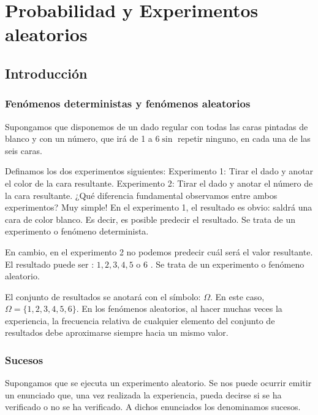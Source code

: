\documentclass[
]{article}
\begin{document}
\section{Probabilidad y Experimentos aleatorios}\label{probabilidad-y-experimentos-aleatorios}

\subsection{Introducción}\label{introducciuxf3n}

\subsubsection{Fenómenos deterministas y fenómenos aleatorios}\label{fenuxf3menos-deterministas-y-fenuxf3menos-aleatorios}

Supongamos que disponemos de un dado regular con todas las caras
pintadas de blanco y con un número, que irá de 1 a \(6 \sin\) repetir
ninguno, en cada una de las seis caras.

Definamos los dos experimentos siguientes: Experimento 1: Tirar el dado
y anotar el color de la cara resultante. Experimento 2: Tirar el dado y
anotar el número de la cara resultante. ¿Qué diferencia fundamental
observamos entre ambos experimentos? Muy simple! En el experimento 1, el
resultado es obvio: saldrá una cara de color blanco. Es decir, es
posible predecir el resultado. Se trata de un experimento o fenómeno
determinista.

En cambio, en el experimento 2 no podemos predecir cuál será el valor
resultante. El resultado puede ser : \(1,2,3,4,5\) o 6 . Se trata de un
experimento o fenómeno aleatorio.

El conjunto de resultados se anotará con el símbolo: \(\Omega\). En este
caso, \(\Omega=\{1,2,3,4,5,6\}\). En los fenómenos aleatorios, al hacer
muchas veces la experiencia, la frecuencia relativa de cualquier
elemento del conjunto de resultados debe aproximarse siempre hacia un
mismo valor.

\subsubsection{Sucesos}\label{sucesos}

Supongamos que se ejecuta un experimento aleatorio. Se nos puede ocurrir
emitir un enunciado que, una vez realizada la experiencia, pueda decirse
si se ha verificado o no se ha verificado. A dichos enunciados los
denominamos sucesos.
\end{document}
